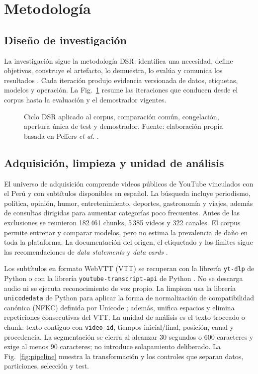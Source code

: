 \section{Metodología}

\subsection{Diseño de investigación}

La investigación sigue la metodología DSR: identifica una necesidad, define objetivos, construye el artefacto, lo demuestra, lo evalúa y comunica los resultados \cite{hevner2004dsr,peffers2007dsrm}. Cada iteración produjo evidencia versionada de datos, etiquetas, modelos y operación. La Fig.~\ref{fig:dsr} resume las iteraciones que conducen desde el corpus hasta la evaluación y el demostrador vigentes.

\begin{figure}[t]
\centering
\resizebox{\textwidth}{!}{}
\caption{Ciclo DSR aplicado al corpus,  comparación común, congelación, apertura única de test y demostrador. Fuente: elaboración propia basada en Peffers \emph{et al.} \cite{peffers2007dsrm}.}
\label{fig:dsr}
\end{figure}

\subsection{Adquisición, limpieza y unidad de análisis}

El universo de adquisición comprende videos públicos de YouTube vinculados con el Perú y con subtítulos disponibles en español. La búsqueda incluye periodismo, política, opinión, humor, entretenimiento, deportes, gastronomía y viajes, además de consultas dirigidas para aumentar categorías poco frecuentes. Antes de las exclusiones se reunieron 182\,461 chunks, 5\,385 videos y 322 canales. El corpus permite entrenar y comparar modelos, pero no estima la prevalencia de daño en toda la plataforma. La documentación del origen, el etiquetado y los límites sigue las recomendaciones de \emph{data statements} y \emph{data cards} \cite{bender2018datastatements,pushkarna2022datacards}.

Los subtítulos en formato WebVTT (VTT) se recuperan con la librería \texttt{yt-dlp} de Python o con la librería \texttt{youtube-transcript-api} de Python \cite{ytdlp2026,depoix2026transcript}. No se descarga audio ni se ejecuta reconocimiento de voz propio. La limpieza usa la librería \texttt{unicodedata} de Python para aplicar la forma de normalización de compatibilidad canónica (NFKC) definida por Unicode \cite{python2026unicodedata,unicode2025normalization}; además, unifica espacios y elimina repeticiones consecutivas del VTT. La unidad de análisis es el texto troceado o chunk: texto contiguo con \texttt{video\_id}, tiempos inicial/final, posición, canal y procedencia. La segmentación se cierra al alcanzar 30 segundos o 600 caracteres y exige al menos 90 caracteres; no introduce solapamiento deliberado. La Fig.~\ref{fig:pipeline} muestra la transformación y los controles que separan datos, particiones, selección y test.

